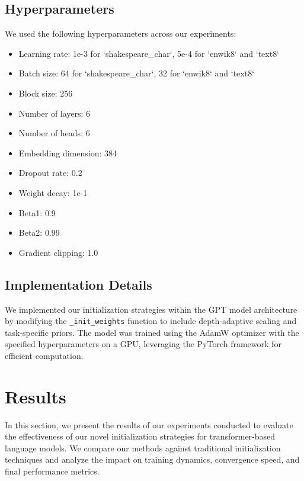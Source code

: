 \documentclass{article} %
\begin{document}
\subsection{Hyperparameters}
We used the following hyperparameters across our experiments:
\begin{itemize}
    \item Learning rate: 1e-3 for `shakespeare\_char`, 5e-4 for `enwik8` and `text8`
    \item Batch size: 64 for `shakespeare\_char`, 32 for `enwik8` and `text8`
    \item Block size: 256
    \item Number of layers: 6
    \item Number of heads: 6
    \item Embedding dimension: 384
    \item Dropout rate: 0.2
    \item Weight decay: 1e-1
    \item Beta1: 0.9
    \item Beta2: 0.99
    \item Gradient clipping: 1.0
\end{itemize}

\subsection{Implementation Details}
We implemented our initialization strategies within the GPT model architecture \cite{karpathy2023nanogpt} by modifying the \texttt{\_init\_weights} function to include depth-adaptive scaling and task-specific priors. The model was trained using the AdamW optimizer \cite{loshchilov2017adamw} with the specified hyperparameters on a GPU, leveraging the PyTorch framework \cite{paszke2019pytorch} for efficient computation.

\section{Results}
\label{sec:results}
In this section, we present the results of our experiments conducted to evaluate the effectiveness of our novel initialization strategies for transformer-based language models. We compare our methods against traditional initialization techniques and analyze the impact on training dynamics, convergence speed, and final performance metrics.
\end{document}

